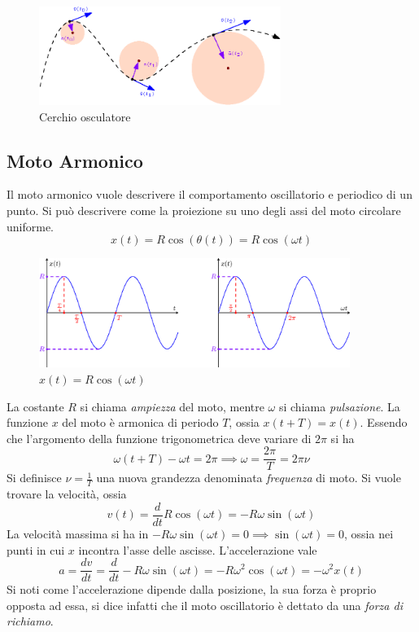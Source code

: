 \documentclass[10pt, letterpaper]{report}
\begin{document}
\begin{center}\begin{figure}[h!]
    \centering
    \includegraphics[width=0.7\textwidth]{images/cerchioOsculante.eps}
    \caption{Cerchio osculatore}
    \label{cerchioOsculante}
\end{figure} \end{center}
\subsection{Moto Armonico}
Il moto armonico vuole descrivere il comportamento oscillatorio e periodico di un punto. Si può 
descrivere come la proiezione su uno degli assi del moto circolare uniforme. 
$$ x(t)=R\cos(\theta(t))=R\cos(\omega t)$$
\begin{center}\begin{figure}[h!]
    \centering
    \includegraphics[width=0.9\textwidth]{images/armonica.eps}
    \caption{$x(t)=R\cos(\omega t)$}
    \label{cerchioOsculante}
\end{figure} \end{center}
La costante $R$ si chiama \textit{ampiezza} del moto, mentre $\omega$ si chiama \textit{pulsazione}.
La funzione $x$ del moto è armonica di periodo $T$, ossia $x(t+T)=x(t)$. Essendo che l'argomento della  funzione  
trigonometrica deve variare di $2\pi$ si ha 
$$\omega(t+T)-\omega t = 2\pi \implies \omega = \frac{2\pi}{T}=2\pi\nu$$
Si definisce $\nu=\frac{1}{T}$ una nuova grandezza denominata \textit{frequenza} di moto.
\acc Si vuole trovare la velocità, ossia 
$$ v(t)=\frac{d}{dt}R\cos(\omega t)=-R\omega\sin(\omega t)$$
La velocità massima si ha in $-R\omega\sin(\omega t)=0\implies \sin(\omega t)=0$, ossia nei punti 
in cui $x$ incontra l'asse delle ascisse. L'accelerazione vale 
$$ a=\frac{dv}{dt}=\frac{d}{dt}-R\omega\sin(\omega t)=-R\omega^2\cos(\omega t)=-\omega^2x(t)$$
Si noti come l'accelerazione dipende dalla posizione, la sua forza è proprio opposta ad essa, 
si dice infatti che il moto oscillatorio è dettato da una \textit{forza di richiamo}.
\flowerLine
\end{document}
